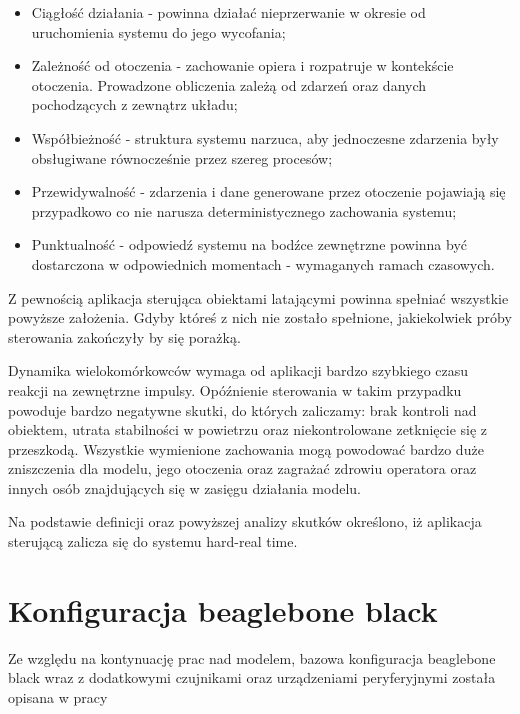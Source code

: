 \begin{itemize}
	\item Ciągłość działania - powinna działać nieprzerwanie w okresie od uruchomienia systemu do jego wycofania;
	
	\item Zależność od otoczenia - zachowanie opiera i rozpatruje w kontekście otoczenia. Prowadzone obliczenia zależą od zdarzeń oraz danych pochodzących z zewnątrz układu;
	
	\item Współbieżność - struktura systemu narzuca, aby jednoczesne zdarzenia były obsługiwane równocześnie przez szereg procesów;
	
	\item Przewidywalność - zdarzenia i dane generowane przez otoczenie pojawiają się przypadkowo co nie narusza deterministycznego zachowania systemu;
	
	\item Punktualność - odpowiedź systemu na bodźce zewnętrzne powinna być dostarczona w odpowiednich momentach - wymaganych ramach czasowych.
\end{itemize}

Z pewnością aplikacja sterująca obiektami latającymi powinna spełniać wszystkie powyższe założenia. Gdyby któreś z nich nie zostało spełnione, jakiekolwiek próby sterowania zakończyły by się porażką.

Dynamika wielokomórkowców wymaga od aplikacji bardzo szybkiego czasu reakcji na zewnętrzne impulsy. Opóźnienie sterowania w takim przypadku powoduje bardzo negatywne skutki, do których zaliczamy: brak kontroli nad obiektem, utrata stabilności w powietrzu oraz niekontrolowane zetknięcie się z przeszkodą. Wszystkie wymienione zachowania mogą powodować bardzo duże zniszczenia dla modelu, jego otoczenia oraz zagrażać zdrowiu operatora oraz innych osób znajdujących się w zasięgu działania modelu.

Na podstawie definicji oraz powyższej analizy skutków określono, iż aplikacja sterującą zalicza się do systemu hard-real time. 




\section{Konfiguracja beaglebone black}
Ze względu na kontynuację prac nad modelem, bazowa konfiguracja beaglebone black wraz z dodatkowymi czujnikami oraz urządzeniami peryferyjnymi została opisana w pracy

